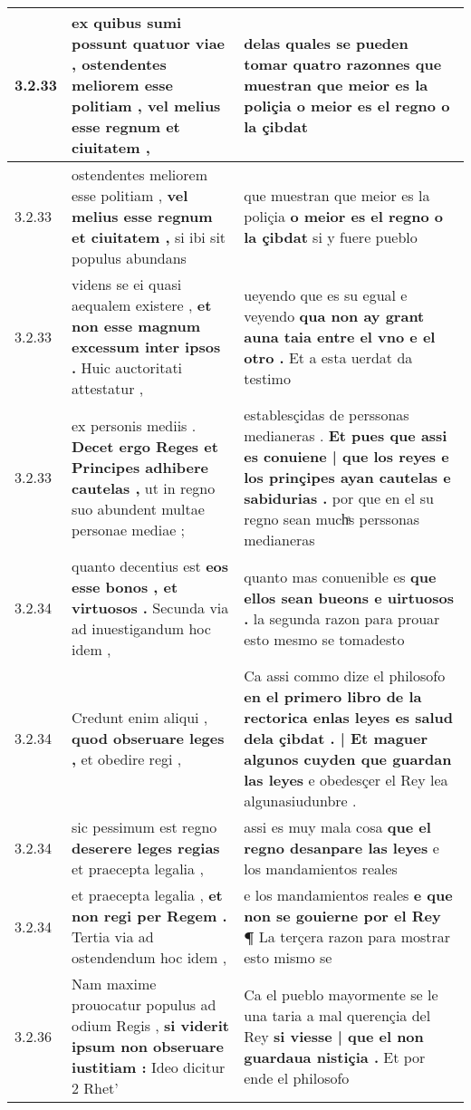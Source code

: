 \begin{tabular}{|p{1cm}|p{6.5cm}|p{6.5cm}|}
3.2.33 & ex quibus sumi possunt quatuor viae , \textbf{ ostendentes meliorem esse politiam , } vel melius esse regnum et ciuitatem , & delas quales se pueden tomar quatro razonnes \textbf{ que muestran que meior es la poliçia } o meior es el regno o la çibdat \\\hline
3.2.33 & ostendentes meliorem esse politiam , \textbf{ vel melius esse regnum et ciuitatem , } si ibi sit populus abundans & que muestran que meior es la poliçia \textbf{ o meior es el regno o la çibdat } si y fuere pueblo \\\hline
3.2.33 & videns se ei quasi aequalem existere , \textbf{ et non esse magnum excessum inter ipsos . } Huic auctoritati attestatur , & ueyendo que es su egual e veyendo \textbf{ qua non ay grant auna taia entre el vno e el otro . } Et a esta uerdat da testimo \\\hline
3.2.33 & ex personis mediis . \textbf{ Decet ergo Reges et Principes adhibere cautelas , } ut in regno suo abundent multae personae mediae ; & establesçidas de perssonas medianeras . \textbf{ Et pues que assi es conuiene | que los reyes e los prinçipes ayan cautelas e sabidurias . } por que en el su regno sean muchͣs perssonas medianeras \\\hline
3.2.34 & quanto decentius est \textbf{ eos esse bonos , et virtuosos . } Secunda via ad inuestigandum hoc idem , & quanto mas conuenible es \textbf{ que ellos sean bueons e uirtuosos . } la segunda razon para prouar esto mesmo se tomadesto \\\hline
3.2.34 & Credunt enim aliqui , \textbf{ quod obseruare leges , } et obedire regi , & Ca assi commo dize el philosofo \textbf{ en el primero libro de la rectorica enlas leyes es salud dela çibdat . | Et maguer algunos cuyden que guardan las leyes } e obedesçer el Rey lea algunasiudunbre . \\\hline
3.2.34 & sic pessimum est regno \textbf{ deserere leges regias } et praecepta legalia , & assi es muy mala cosa \textbf{ que el regno desanpare las leyes } e los mandamientos reales \\\hline
3.2.34 & et praecepta legalia , \textbf{ et non regi per Regem . } Tertia via ad ostendendum hoc idem , & e los mandamientos reales \textbf{ e que non se gouierne por el Rey ¶ } La terçera razon para mostrar esto mismo se \\\hline
3.2.36 & Nam maxime prouocatur populus ad odium Regis , \textbf{ si viderit ipsum non obseruare iustitiam : } Ideo dicitur 2 Rhet’ & Ca el pueblo mayormente se le una taria a mal querençia del Rey \textbf{ si viesse | que el non guardaua nistiçia . } Et por ende el philosofo \\\hline

\end{tabular}
